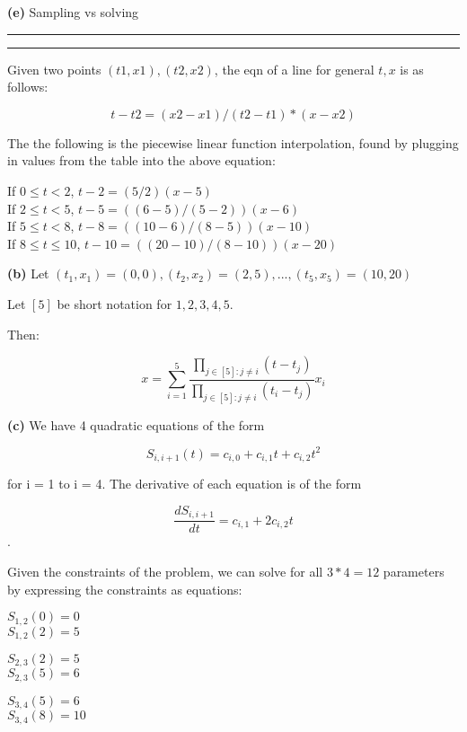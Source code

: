 \documentclass[11pt,letterpaper]{article}
\newcommand{\question}[1] {\vspace{.25in} \hrule\vspace{0.5em}
\noindent{\bf #1} \vspace{0.5em}
\hrule \vspace{.10in}}
\renewcommand{\part}[1] {\vspace{.10in} {\bf (#1)}}
\begin{document}
\part{e}
Sampling vs solving

\question{3}
Given two points $(t1,x1),(t2,x2)$, the eqn of a line for general $t,x$ is as follows:

$$t - t2 = (x2 - x1)/(t2 - t1) * (x - x2)$$

The the following is the piecewise linear function interpolation, found by plugging in values from the table into the above equation:

If $0 \leq t < 2$, $t - 2 = (5/2)(x - 5)$\\
If $2 \leq t < 5$, $t - 5 = ((6-5)/(5-2))(x-6)$\\
If $5 \leq t < 8$, $t - 8 = ((10-6)/(8-5))(x-10)$\\
If $8 \leq t \leq 10$, $t - 10 = ((20-10)/(8-10))(x-20)$

\part{b}
Let $(t_1, x_1) = (0,0), (t_2, x_2) = (2,5), ... , (t_5,x_5) = (10,20) $

Let $[5]$ be short notation for ${1,2,3,4,5}$.

Then:

$$x = \sum_{i=1}^{5} \frac{\prod_{j \in [5] : j \neq i} (t - t_j)}{\prod_{j \in [5] : j \neq i} (t_i - t_j)} x_i$$

\part{c}
We have 4 quadratic equations of the form

$$S_{i,i+1}(t) = c_{i,0} + c_{i,1} t + c_{i,2} t^2$$

for i = 1 to i = 4. The derivative of each equation is of the form

$$\frac{dS_{i,i+1}}{dt} = c_{i,1} + 2c_{i,2} t$$.

Given the constraints of the problem, we can solve for all $3 * 4 = 12$ parameters by expressing the constraints as equations:

$S_{1,2}(0) = 0$\\
$S_{1,2}(2) = 5$

$S_{2,3}(2) = 5$\\
$S_{2,3}(5) = 6$

$S_{3,4}(5) = 6$\\
$S_{3,4}(8) = 10$
\end{document}
